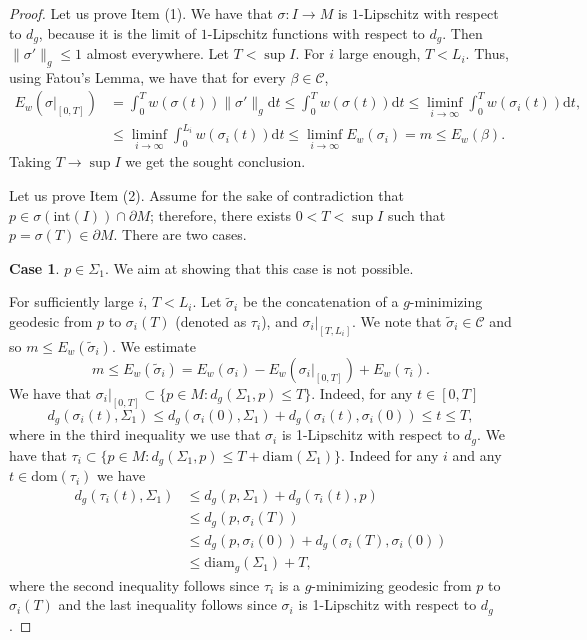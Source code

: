 \documentclass[12pt,a4paper,reqno]{amsart}
\theoremstyle{definition}
\renewcommand{\leq}{\leqslant}
\renewcommand{\tilde}{\widetilde}
\begin{document}
{{\begin{proof}
Let us prove Item (1). We have that $\sigma:I\to M$ is $1$-Lipschitz with respect to $d_g$, because it is the limit of $1$-Lipschitz functions with respect to $d_g$. Then $\|\sigma'\|_g\leq 1$ almost everywhere. Let $T<\sup I$. For $i$ large enough, $T<L_i$. Thus, using Fatou's Lemma, we have that for every $\beta\in\mathcal{C}$,
\begin{equation}\label{eqn:Fatou'sLemma}
\begin{aligned}
E_w(\sigma|_{[0,T]})&=\int_0^T w(\sigma(t))\|\sigma'\|_g\mathrm{d}t \leq \int_0^T w(\sigma(t))\mathrm{d}t \leq \liminf_{i\to\infty} \int_0^T w(\sigma_i(t))\mathrm{d}t, \\
&\leq \liminf_{i\to\infty} \int_0^{L_i} w(\sigma_i(t))\mathrm{d}t \leq \liminf_{i\to\infty} E_w(\sigma_i) = m \leq E_w(\beta).
\end{aligned}
\end{equation}
Taking $T\to \sup I$ we get the sought conclusion.
\smallskip

Let us prove Item (2). Assume for the sake of contradiction that $p \in \sigma(\mathrm{int}(I))\cap \partial M$; therefore, there exists $0<T<\sup I$ such that $p=\sigma(T)\in\partial M$. There are two cases.

\textbf{Case 1}. $p\in\Sigma_1$. We aim at showing that this case is not possible.

For sufficiently large $i$, $T<L_i$. Let $\tilde{\sigma}_i$ be the concatenation of a $g$-minimizing geodesic from $p$ to $\sigma_{i}(T)$ (denoted as $\tau_i$), and $\sigma_{i}|_{[T,L_i]}$. We note that $\tilde{\sigma}_i\in \mathcal{C}$ and so $m\leq E_w (\tilde{\sigma}_i)$. We estimate
\begin{equation}\label{eqn:InequalityOnE}
m\leq E_w (\tilde{\sigma}_i)=E_w (\sigma_{i})-E_w (\sigma_{i}|_{[0,T]}) + E_w (\tau_i).
\end{equation}
We have that $\sigma_{i}|_{[0,T]} \subset \{p\in M:d_g(\Sigma_1,p)\leq T\}$. Indeed, for any $t\in [0,T]$
\[
d_{g}(\sigma_{i}(t),\Sigma_1)\leq d_g(\sigma_{i}(0), \Sigma_1)+d_g(\sigma_{i}(t), \sigma_{i}(0)) \leq t\leq T,
\]
where in the third inequality we use that $\sigma_{i}$ is 1-Lipschitz with respect to $d_g$. We have that $\tau_i \subset \{p\in M:d_g(\Sigma_1,p)\leq T+\mathrm{diam}(\Sigma_1)\}$. Indeed for any $i$ and any $t\in\mathrm{dom}(\tau_i)$ we have
\begin{align*}
    d_{g}(\tau_i(t),\Sigma_1)&\leq d_g(p, \Sigma_1)+d_g(\tau_i(t), p) \\
    &\leq d_g(p, \sigma_{i}(T))\\
    &\leq d_g(p, \sigma_{i}(0))+ d_g(\sigma_{i}(T), \sigma_{i}(0)) \\
    &\leq \mathrm{diam}_g(\Sigma_1)+T,
\end{align*}
where the second inequality follows since $\tau_i$ is a $g$-minimizing geodesic from $p$ to $\sigma_{i}(T)$ and the last inequality follows since $\sigma_{i}$ is 1-Lipschitz with respect to $d_g$.


\end{proof}}}
\end{document}

